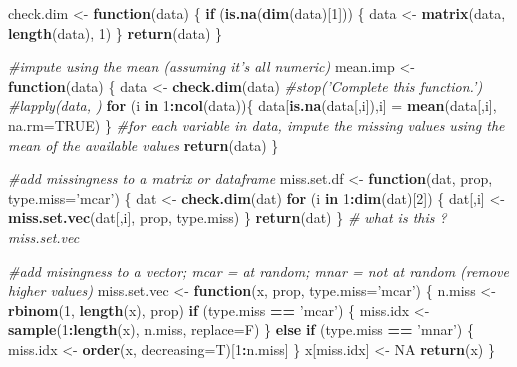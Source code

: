 \documentclass[]{article}
\newenvironment{Shaded}{\begin{snugshade}}{\end{snugshade}}
\newcommand{\KeywordTok}[1]{\textcolor[rgb]{0.13,0.29,0.53}{\textbf{#1}}}
\newcommand{\DataTypeTok}[1]{\textcolor[rgb]{0.13,0.29,0.53}{#1}}
\newcommand{\DecValTok}[1]{\textcolor[rgb]{0.00,0.00,0.81}{#1}}
\newcommand{\StringTok}[1]{\textcolor[rgb]{0.31,0.60,0.02}{#1}}
\newcommand{\CommentTok}[1]{\textcolor[rgb]{0.56,0.35,0.01}{\textit{#1}}}
\newcommand{\OtherTok}[1]{\textcolor[rgb]{0.56,0.35,0.01}{#1}}
\newcommand{\ControlFlowTok}[1]{\textcolor[rgb]{0.13,0.29,0.53}{\textbf{#1}}}
\newcommand{\OperatorTok}[1]{\textcolor[rgb]{0.81,0.36,0.00}{\textbf{#1}}}
\newcommand{\NormalTok}[1]{#1}
\begin{document}
\begin{Shaded}
\begin{Highlighting}[]
\NormalTok{check.dim <-}\StringTok{ }\ControlFlowTok{function}\NormalTok{(data) \{}
    \ControlFlowTok{if}\NormalTok{ (}\KeywordTok{is.na}\NormalTok{(}\KeywordTok{dim}\NormalTok{(data)[}\DecValTok{1}\NormalTok{])) \{}
\NormalTok{        data <-}\StringTok{ }\KeywordTok{matrix}\NormalTok{(data, }\KeywordTok{length}\NormalTok{(data), }\DecValTok{1}\NormalTok{)}
\NormalTok{    \}}
    \KeywordTok{return}\NormalTok{(data)}
\NormalTok{\}}

\CommentTok{#impute using the mean (assuming it's all numeric)}
\NormalTok{mean.imp <-}\StringTok{ }\ControlFlowTok{function}\NormalTok{(data) \{ }
\NormalTok{    data <-}\StringTok{ }\KeywordTok{check.dim}\NormalTok{(data)}
    \CommentTok{#stop('Complete this function.')}
    \CommentTok{#lapply(data, )}
    \ControlFlowTok{for}\NormalTok{ (i }\ControlFlowTok{in} \DecValTok{1}\OperatorTok{:}\KeywordTok{ncol}\NormalTok{(data))\{ }
\NormalTok{      data[}\KeywordTok{is.na}\NormalTok{(data[,i]),i] =}\StringTok{ }\KeywordTok{mean}\NormalTok{(data[,i], }\DataTypeTok{na.rm=}\OtherTok{TRUE}\NormalTok{)}
\NormalTok{    \}}
    \CommentTok{#for each variable in data, impute the missing values using the mean of the available values}
    \KeywordTok{return}\NormalTok{(data)}
\NormalTok{\}}

\CommentTok{#add missingness to a matrix or dataframe}
\NormalTok{miss.set.df <-}\StringTok{ }\ControlFlowTok{function}\NormalTok{(dat, prop, }\DataTypeTok{type.miss=}\StringTok{'mcar'}\NormalTok{) \{}
\NormalTok{    dat <-}\StringTok{ }\KeywordTok{check.dim}\NormalTok{(dat)}
    \ControlFlowTok{for}\NormalTok{ (i }\ControlFlowTok{in} \DecValTok{1}\OperatorTok{:}\KeywordTok{dim}\NormalTok{(dat)[}\DecValTok{2}\NormalTok{]) \{}
\NormalTok{        dat[,i] <-}\StringTok{ }\KeywordTok{miss.set.vec}\NormalTok{(dat[,i], prop, type.miss)}
\NormalTok{    \}}
    \KeywordTok{return}\NormalTok{(dat)}
\NormalTok{\}}
\CommentTok{# what is this ?miss.set.vec}

\CommentTok{#add misingness to a vector; mcar = at random; mnar = not at random (remove higher values)}
\NormalTok{miss.set.vec <-}\StringTok{ }\ControlFlowTok{function}\NormalTok{(x, prop, }\DataTypeTok{type.miss=}\StringTok{'mcar'}\NormalTok{) \{}
\NormalTok{    n.miss <-}\StringTok{ }\KeywordTok{rbinom}\NormalTok{(}\DecValTok{1}\NormalTok{, }\KeywordTok{length}\NormalTok{(x), prop)}
    \ControlFlowTok{if}\NormalTok{ (type.miss }\OperatorTok{==}\StringTok{ 'mcar'}\NormalTok{) \{}
\NormalTok{        miss.idx <-}\StringTok{ }\KeywordTok{sample}\NormalTok{(}\DecValTok{1}\OperatorTok{:}\KeywordTok{length}\NormalTok{(x), n.miss, }\DataTypeTok{replace=}\NormalTok{F)}
\NormalTok{    \} }\ControlFlowTok{else} \ControlFlowTok{if}\NormalTok{ (type.miss }\OperatorTok{==}\StringTok{ 'mnar'}\NormalTok{) \{}
\NormalTok{        miss.idx <-}\StringTok{ }\KeywordTok{order}\NormalTok{(x, }\DataTypeTok{decreasing=}\NormalTok{T)[}\DecValTok{1}\OperatorTok{:}\NormalTok{n.miss]}
\NormalTok{    \}}
\NormalTok{    x[miss.idx] <-}\StringTok{ }\OtherTok{NA}
    \KeywordTok{return}\NormalTok{(x)}
\NormalTok{\}}


\end{Highlighting}
\end{Shaded}
\end{document}
